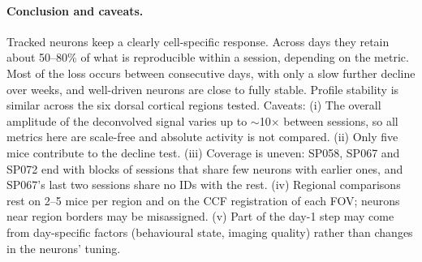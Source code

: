 \documentclass[10pt,a4paper]{article}
\begin{document}
\paragraph{Conclusion and caveats.}
Tracked neurons keep a clearly cell-specific response. Across days they retain about 50--80\% of what is reproducible within a session, depending on the metric.
Most of the loss occurs between consecutive days, with only a slow further decline over weeks, and well-driven neurons are close to fully stable. Profile stability is similar across the six dorsal cortical regions tested.
Caveats:
(i) The overall amplitude of the deconvolved signal varies up to $\sim$10$\times$ between sessions, so all metrics here are scale-free and absolute activity is not compared.
(ii) Only five mice contribute to the decline test.
(iii) Coverage is uneven: SP058, SP067 and SP072 end with blocks of sessions that share few neurons with earlier ones, and SP067's last two sessions share no IDs with the rest.
(iv) Regional comparisons rest on 2--5 mice per region and on the CCF registration of each FOV; neurons near region borders may be misassigned.
(v) Part of the day-1 step may come from day-specific factors (behavioural state, imaging quality) rather than changes in the neurons' tuning.
\end{document}

